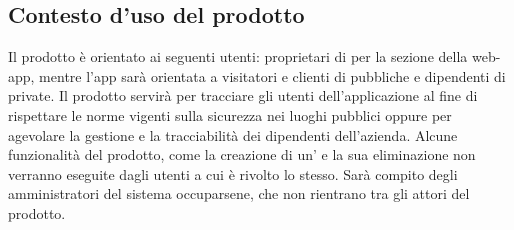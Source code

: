 \subsection{Contesto d'uso del prodotto}
Il prodotto è orientato ai seguenti utenti: proprietari di  per la sezione della web-app, mentre l'app sarà orientata a visitatori e clienti di  pubbliche e dipendenti di  private.
Il prodotto servirà per tracciare gli utenti dell'applicazione al fine di rispettare le norme vigenti sulla sicurezza nei luoghi pubblici oppure per agevolare la gestione e la tracciabilità dei dipendenti dell'azienda.
Alcune funzionalità del prodotto, come la creazione di un' e la sua eliminazione non verranno eseguite dagli utenti a cui è rivolto lo stesso. Sarà compito degli amministratori del sistema \NomeProgetto{} occuparsene, che non rientrano tra gli attori del prodotto.

